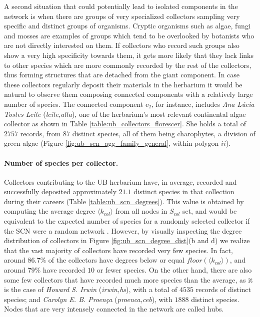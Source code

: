A second situation that could potentially lead to isolated components in the network is when there are groups of very specialized collectors sampling very specific and distinct groups of organisms. 
Cryptic organisms such as algae, fungi and mosses are examples of groups which tend to be overlooked by botanists who are not directly interested on them. 
If collectors who record such groups also show a very high specificity towards them, it gets more likely that they lack links to other species which are more commonly recorded by the rest of the collectors, thus forming structures that are detached from the giant component. 
In case these collectors regularly deposit their materials in the herbarium it would be natural to observe them composing connected components with a relatively large number of species.
The connected component $c_2$, for instance, includes \textit{Ana Lúcia Tostes Leite} (\textit{leite,alta}), one of the herbarium's most relevant continental algae collector as shown in Table \ref{table:ub_collectors_florescer}.
She holds a total of $2757$ records, from $87$ distinct species, all of them being charophytes, a division of green algae (Figure \ref{fig:ub_scn_agg_family_general}, within polygon $ii$).



\paragraph*{Number of species per collector.}
Collectors contributing to the UB herbarium have, in average, recorded and successfully deposited approximately $21.1$ distinct species in that collection during their careers (Table \ref{table:ub_scn_degrees}). This value is obtained by computing the average degree $\langle k_{col} \rangle$ from all nodes in $S_{col}$ set, and would be equivalent to the expected number of species for a randomly selected collector if the SCN were a random network \cite{Albert2002}.
However, by visually inspecting the degree distribution of collectors in Figure \ref{fig:ub_scn_degree_dist}(b and d) we realize that the vast majority of collectors have recorded very few species. In fact, around $86.7\%$ of the collectors have degrees below or equal $floor(\langle k_{col} \rangle)$, and around $79\%$ have recorded $10$ or fewer species.
On the other hand, there are also some few collectors that have recorded much more species than the average, as it is the case of \textit{Howard S. Irwin} (\textit{irwin,hs}), with a total of $4535$ records of distinct species; and \textit{Carolyn E. B. Proença} (\textit{proenca,ceb}), with $1888$ distinct species. Nodes that are very intensely connected in the network are called hubs.

